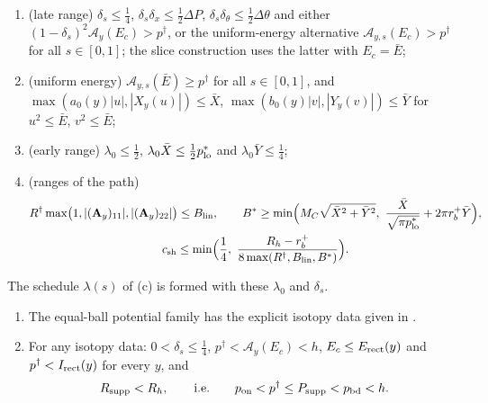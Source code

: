 \begin{definition}
\begin{enumerate}[label=(D\arabic*)]
\item\label{I:it:pln-D4} (late range) $\delta_s\le\frac14$, $\delta_s\delta_x\le\frac12\Delta P$, $\delta_s\delta_\theta\le\frac12\Delta\theta$ and
 either $(1-\delta_s)^2\mathcal A_y(E_c)>p^\dagger$, or the
 uniform-energy alternative $\mathcal A_{y,s}(E_c)>p^\dagger$ for all $s\in[0,1]$;
 the slice construction uses the latter with $E_c=\bar E$;
\item\label{I:it:pln-D5} (uniform energy) $\mathcal A_{y,s}(\bar E)\ge p^\dagger$ for all $s\in[0,1]$, and
 $\max(a_0(y)|u|,|X_y(u)|)\le\bar X$, $\max(b_0(y)|v|,|Y_y(v)|)\le\bar Y$ for $u^2\le\bar E$, $v^2\le\bar E$;
\item\label{I:it:pln-D6} (early range) $\lambda_0\le\frac12$, $\lambda_0\bar X\le\frac12p^*_{\rm lo}$ and $\lambda_0\bar Y\le\frac14$;
\item\label{I:it:pln-D7} (ranges of the path)
 \begin{gather*}
  R^\dagger\max\bigl(1,|(\mathbf A_y)_{11}|,|(\mathbf A_y)_{22}|\bigr)\le B_{\rm lin},\qquad
  B^*\ge\min\Bigl(M_C\sqrt{\bar X^2+\bar Y^2},\ \frac{\bar X}{\sqrt{\pi p^*_{\rm lo}}}+2\pi r_b^+\bar Y\Bigr),\\
  c_{\rm sh}\le\min\Bigl(\frac14,\ \frac{R_h-r_b^+}{8\max(R^\dagger,B_{\rm lin},B^*)}\Bigr).
 \end{gather*}
\end{enumerate}
The schedule $\lambda(s)$ of (c) is formed with these $\lambda_0$ and $\delta_s$.
\end{definition}

\begin{lemma}\label{I:lem:pln-data}
\begin{enumerate}[label=(\alph*)]
\item The equal-ball potential family has the explicit isotopy data given in .
\item For any isotopy data: $0<\delta_s\le\frac14$, $p^\dagger<\mathcal A_y(E_c)<h$,
 $E_c\le E_{\rm rect}(y)$ and $p^\dagger<I_{\rm rect}(y)$ for every $y$, and
 \[
  R_{\rm supp}<R_h,\qquad\text{i.e.}\qquad p_{\rm on}<p^\dagger\le P_{\rm supp}<p_{\rm bd}<h .
 \]
\end{enumerate}
\end{lemma}

